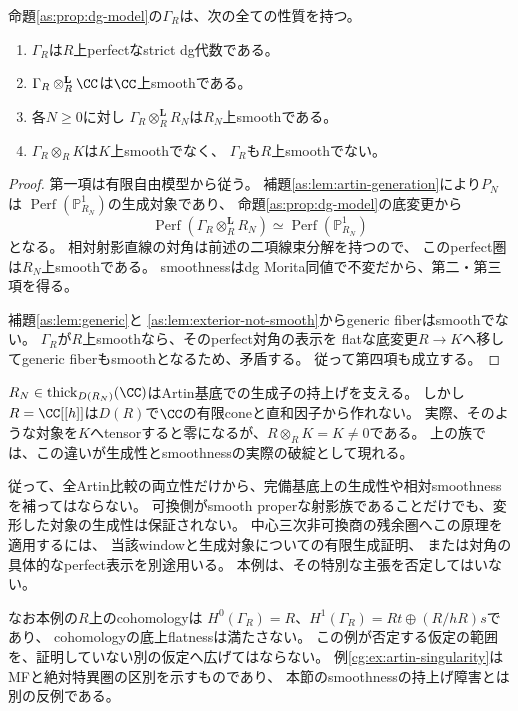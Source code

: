 \begin{theorem}[全Artin切断ではsmoothだが完備基底ではsmoothでない族]
\label{as:thm:obstruction}
命題\ref{as:prop:dg-model}の$\Gamma_R$は、次の全ての性質を持つ。
\begin{enumerate}
 \item $\Gamma_R$は$R$上perfectなstrict dg代数である。
 \item $\Gamma_R\otimes_R^{\mathbf L}\CC$は$\CC$上smoothである。
 \item 各$N\ge0$に対し
 $\Gamma_R\otimes_R^{\mathbf L}R_N$は$R_N$上smoothである。
 \item $\Gamma_R\otimes_R K$は$K$上smoothでなく、
 $\Gamma_R$も$R$上smoothでない。
\end{enumerate}
\end{theorem}
\begin{proof}
第一項は有限自由模型から従う。
補題\ref{as:lem:artin-generation}により$P_N$は
$\operatorname{Perf}(\mathbb P^1_{R_N})$の生成対象であり、
命題\ref{as:prop:dg-model}の底変更から
\[
 \operatorname{Perf}(\Gamma_R\otimes_R^{\mathbf L}R_N)
 \simeq\operatorname{Perf}(\mathbb P^1_{R_N})
\]
となる。
相対射影直線の対角は前述の二項線束分解を持つので、
このperfect圏は$R_N$上smoothである。
smoothnessはdg Morita同値で不変だから、第二・第三項を得る。

補題\ref{as:lem:generic}と
\ref{as:lem:exterior-not-smooth}からgeneric fiberはsmoothでない。
$\Gamma_R$が$R$上smoothなら、そのperfect対角の表示を
flatな底変更$R\to K$へ移してgeneric fiberもsmoothとなるため、矛盾する。
従って第四項も成立する。
\end{proof}

\begin{remark}[この反例の適用範囲]
$R_N\in\operatorname{thick}_{D(R_N)}(\CC)$はArtin基底での生成子の持上げを支える。
しかし$R=\CC[[h]]$は$D(R)$で$\CC$の有限coneと直和因子から作れない。
実際、そのような対象を$K$へtensorすると零になるが、$R\otimes_RK=K\ne0$である。
上の族では、この違いが生成性とsmoothnessの実際の破綻として現れる。

従って、全Artin比較の両立性だけから、完備基底上の生成性や相対smoothnessを補ってはならない。
可換側がsmooth properな射影族であることだけでも、変形した対象の生成性は保証されない。
中心三次非可換商の残余圏へこの原理を適用するには、
当該windowと生成対象についての有限生成証明、
または対角の具体的なperfect表示を別途用いる。
本例は、その特別な主張を否定してはいない。

なお本例の$R$上のcohomologyは
$H^0(\Gamma_R)=R$、$H^1(\Gamma_R)=Rt\oplus(R/hR)s$であり、
cohomologyの底上flatnessは満たさない。
この例が否定する仮定の範囲を、証明していない別の仮定へ広げてはならない。
例\ref{cg:ex:artin-singularity}はMFと絶対特異圏の区別を示すものであり、
本節のsmoothnessの持上げ障害とは別の反例である。
\end{remark}
